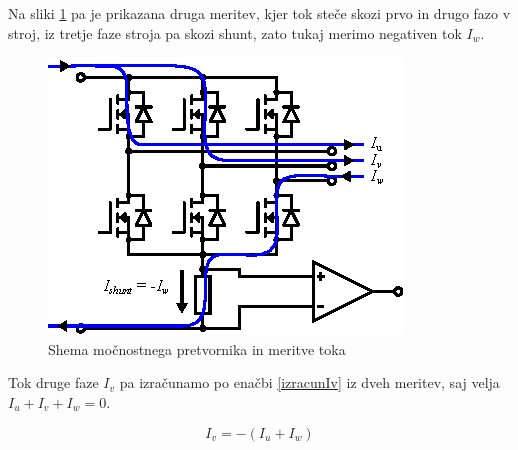 \documentclass[a4paper,twoside,openright,12pt,slovene]{book}
\begin{document}
Na sliki \ref{meritevTokaIw} pa je prikazana druga meritev, kjer tok steče skozi prvo in drugo fazo v stroj, iz tretje faze stroja pa skozi shunt, zato tukaj merimo negativen tok $I_w$. 

\begin{figure}[!htbp]
    \centering
    \includegraphics[width=0.75\columnwidth]{Slike/Inkscape/meritevTokaIw.eps}
    \caption{\label{meritevTokaIw} Shema močnostnega pretvornika in meritve toka }
\end{figure}

Tok druge faze $I_v$ pa izračunamo po enačbi \ref{izracunIv} iz dveh meritev, saj velja $I_u + I_v + I_w = 0$.


\begin{equation} \label{izracunIv}
I_v = -(I_u + I_w)
\end{equation}


%
%
%
%
%
%
\end{document}

